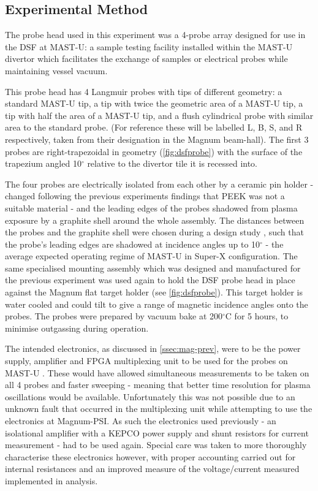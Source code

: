 \documentclass[a4paper, 12pt]{article} %
\begin{document}
\subsection{\label{ssec:mag-exp-method}Experimental Method}
	The probe head used in this experiment was a 4-probe array designed for use in the DSF at MAST-U: a sample testing facility installed within the MAST-U divertor which facilitates the exchange of samples or electrical probes while maintaining vessel vacuum.
	 
	This probe head has 4 Langmuir probes with tips of different geometry: a standard MAST-U tip, a tip with twice the geometric area of a MAST-U tip, a tip with half the area of a MAST-U tip, and a flush cylindrical probe with similar area to the standard probe. 
	(For reference these will be labelled L, B, S, and R respectively, taken from their designation in the Magnum beam-hall). 
	The first 3 probes are right-trapezoidal in geometry (\cref{fig:dsfprobe}) with the surface of the trapezium angled 10$^{\circ}$ relative to the divertor tile it is recessed into.

	The four probes are electrically isolated from each other by a ceramic pin holder - changed following the previous experiments findings that PEEK was not a suitable material - and the leading edges of the probes shadowed from plasma exposure by a graphite shell around the whole assembly. 
	The distances between the probes and the graphite shell were chosen during a design study \cite{Harrison}, such that the probe's leading edges are shadowed at incidence angles up to 10$^{\circ}$ - the average expected operating regime of MAST-U in Super-X configuration.	
	The same specialised mounting assembly which was designed and manufactured for the previous experiment was used again to hold the DSF probe head in place against the Magnum flat target holder (see \cref{fig:dsfprobe}).
	This target holder is water cooled and could tilt to give a range of magnetic incidence angles onto the probes.
	The probes were prepared by vacuum bake at 200$^{\circ}$C for 5 hours, to minimise outgassing during operation.
	
	The intended electronics, as discussed in \cref{ssec:mag-prev}, were to be the power supply, amplifier and FPGA multiplexing unit to be used for the probes on MAST-U \cite{Lovell2017}. 
	These would have allowed simultaneous measurements to be taken on all 4 probes and faster sweeping - meaning that better time resolution for plasma oscillations would be available. 
	Unfortunately this was not possible due to an unknown fault that occurred in the multiplexing unit while attempting to use the electronics at Magnum-PSI. 
	As such the electronics used previously - an isolational amplifier with a KEPCO power supply and shunt resistors for current measurement - had to be used again. 
	Special care was taken to more thoroughly characterise these electronics however, with proper accounting carried out for internal resistances and an improved measure of the voltage/current measured implemented in analysis.
	
\end{document}
